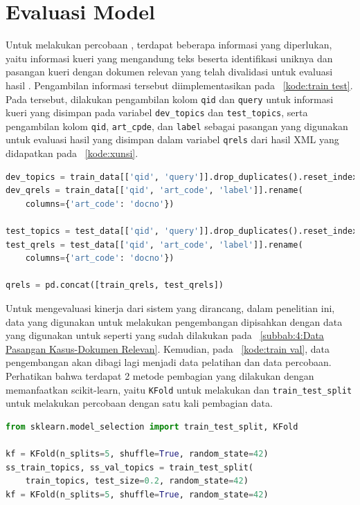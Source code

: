 \section{Evaluasi Model}
\label{subbab:4:Evaluasi Model}

Untuk melakukan percobaan \retrieval{}, terdapat beberapa informasi yang diperlukan, yaitu informasi kueri yang mengandung teks beserta identifikasi uniknya dan pasangan kueri dengan dokumen relevan yang telah divalidasi untuk evaluasi hasil \retrieval{}. Pengambilan informasi tersebut diimplementasikan pada \kode{}~\ref{kode:train test}. Pada \kode{} tersebut, dilakukan pengambilan kolom \lstinline{qid} dan \lstinline{query} untuk informasi kueri yang disimpan pada variabel \lstinline{dev_topics} dan \lstinline{test_topics}, serta pengambilan kolom \lstinline{qid}, \lstinline{art_cpde}, dan \lstinline{label} sebagai pasangan yang digunakan untuk evaluasi hasil \retrieval{} yang disimpan dalam variabel \lstinline{qrels} dari hasil \parsing{} \file{} XML yang didapatkan pada \kode{}~\ref{kode:xunsi}.

\begin{lstlisting}[language=Python, caption={Pembagian data \training{} dan data \testing{}}, label={kode:train test}]
dev_topics = train_data[['qid', 'query']].drop_duplicates().reset_index(drop=True)
dev_qrels = train_data[['qid', 'art_code', 'label']].rename(
    columns={'art_code': 'docno'})

test_topics = test_data[['qid', 'query']].drop_duplicates().reset_index(drop=True)
test_qrels = test_data[['qid', 'art_code', 'label']].rename(
    columns={'art_code': 'docno'})

qrels = pd.concat([train_qrels, test_qrels])
\end{lstlisting}

Untuk mengevaluasi kinerja dari sistem yang dirancang, dalam penelitian ini, data yang digunakan untuk melakukan pengembangan dipisahkan dengan data yang digunakan untuk \testing{} seperti yang sudah dilakukan pada \subbab{}~\ref{subbab:4:Data Pasangan Kasus-Dokumen Relevan}.  Kemudian, pada \kode{}~\ref{kode:train val}, data pengembangan akan dibagi lagi menjadi data pelatihan dan data percobaan. Perhatikan bahwa terdapat 2 metode pembagian yang dilakukan dengan memanfaatkan \library{} scikit-learn, yaitu \lstinline{KFold} untuk melakukan \fcv{} dan \lstinline{train_test_split} untuk melakukan percobaan dengan satu kali pembagian data.
\begin{lstlisting}[language=Python, caption={Pembagian data pelatihan dan data percobaan}, label={kode:train val}]
from sklearn.model_selection import train_test_split, KFold

kf = KFold(n_splits=5, shuffle=True, random_state=42)
ss_train_topics, ss_val_topics = train_test_split(
    train_topics, test_size=0.2, random_state=42)
kf = KFold(n_splits=5, shuffle=True, random_state=42)
\end{lstlisting}


